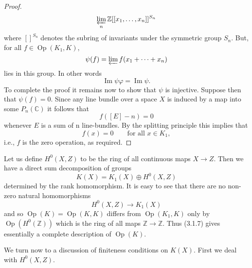 \documentclass[leqno]{book}
\numberwithin{equation}{section}
\theoremstyle{definition}
\begin{document}
\begin{proof}
\begin{equation*}
                \varprojlim_{n}\mathbb{Z}[[x_1, \ldots ,x_{n}]]^{S_{n}}
              \end{equation*}
              where $[]^{S_{n}}$ denotes the subring of invariants under the symmetric group $S_{n}$. But, for all $f \in \operatorname{Op}(K_1,K)$,
              \begin{equation*}
                \psi(f)=\varprojlim f(x_1+ \cdots +x_{n})
              \end{equation*}
              lies in this group. In other words
              \begin{equation*}
                \operatorname{Im}\psi \varphi =\operatorname{Im} \psi.
              \end{equation*}
              To complete the proof it remains now to show that $\psi$ is injective. Suppose then that $\psi(f)=0$. Since any line bundle over a space $X$ is induced by a map into some $P_{n}(\mathbb{C})$ it follows that
              \begin{equation*}
                f([E]-n)=0
              \end{equation*}
              whenever $E$ is a sum of n line-bundles. By the splitting principle this implies that
              \begin{equation*}
                f(x)=0 \qquad \text{for all } x\in K_{1},
              \end{equation*}
              i.e., $f$ is the zero operation, as required.
            \end{proof}

            Let us define $H^{0}(X,Z)$ to be the ring of all continuous maps $X\to Z$. Then we have a direct sum decomposition of groups
            \begin{equation*}
              K(X)=K_1(X)\oplus H^{0}(X,Z)
            \end{equation*}
            determined by the rank homomorphism. It is easy to see that there are no non-zero natural homomorphisms
            \begin{equation*}
              H^{0}(X,Z)\to K_1(X)
            \end{equation*}
            and so $\operatorname{Op}(K)=\operatorname{Op}(K,K)$ differs from $\operatorname{Op}(K_1,K)$ only by $\operatorname{Op}(H^{0}(\mathbb{Z}))$ which is the ring of all maps $\mathbb{Z}\to \mathbb{Z}$. Thus (3.1.7) gives essentially a complete description of $\operatorname{Op}(K)$.

            We turn now to a discussion of finiteness conditions on $K(X)$. First we deal with $H^{0}(X,Z)$.
\end{document}
